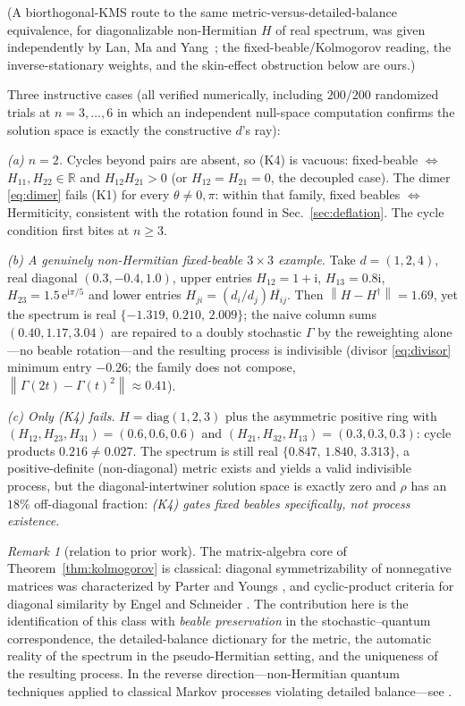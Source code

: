 \documentclass[11pt]{article}
\theoremstyle{definition}
\theoremstyle{remark}
\newtheorem{remark}[theorem]{Remark}
\newcommand{\ii}{\mathrm{i}}
\newcommand{\ee}{\mathrm{e}}
\newcommand{\Gam}{\Gamma}
\newcommand{\norm}[1]{\left\lVert #1 \right\rVert}
\begin{document}
(A biorthogonal-KMS route to the same metric-versus-detailed-balance
equivalence, for diagonalizable non-Hermitian $H$ of real spectrum, was
given independently by Lan, Ma and Yang~\cite{LanMaYang2026}; the
fixed-beable/Kolmogorov reading, the inverse-stationary weights, and the
skin-effect obstruction below are ours.)

Three instructive cases (all verified numerically, including $200/200$
randomized trials at $n=3,\dots,6$ in which an independent null-space
computation confirms the solution space is exactly the constructive
$d$'s ray):

\emph{(a) $n=2$.} Cycles beyond pairs are absent, so (K4) is vacuous:
fixed-beable $\Leftrightarrow$ $H_{11},H_{22}\in\mathbb R$ and
$H_{12}H_{21}>0$ (or $H_{12}=H_{21}=0$, the decoupled case). The dimer \eqref{eq:dimer} fails (K1) for every
$\theta\ne 0,\pi$: within that family, fixed beables $\Leftrightarrow$
Hermiticity, consistent with the rotation found in
Sec.~\ref{sec:deflation}. The cycle condition first bites at $n\ge 3$.

\emph{(b) A genuinely non-Hermitian fixed-beable $3\times3$ example.}
Take $d=(1,2,4)$, real diagonal $(0.3,-0.4,1.0)$, upper entries
$H_{12}=1+\ii$, $H_{13}=0.8\ii$, $H_{23}=1.5\,\ee^{\ii\pi/5}$ and lower
entries $H_{ji}=(d_i/d_j)\overline{H_{ij}}$. Then
$\norm{H-H^{\dagger}}=1.69$, yet the spectrum is real
$\{-1.319,\,0.210,\,2.009\}$; the naive column sums $(0.40,1.17,3.04)$ are
repaired to a doubly stochastic $\Gam$ by the reweighting alone---no
beable rotation---and the resulting process is indivisible (divisor \eqref{eq:divisor} minimum
entry $-0.26$; the family does not compose, $\norm{\Gam(2t)-\Gam(t)^{2}}\approx0.41$).

\emph{(c) Only (K4) fails.} $H=\mathrm{diag}(1,2,3)$ plus the asymmetric
positive ring with $(H_{12},H_{23},H_{31})=(0.6,0.6,0.6)$ and
$(H_{21},H_{32},H_{13})=(0.3,0.3,0.3)$: cycle products $0.216\ne0.027$.
The spectrum is still real $\{0.847,\,1.840,\,3.313\}$, a positive-definite
(non-diagonal) metric exists and yields a valid indivisible process, but
the diagonal-intertwiner solution space is exactly zero and $\rho$ has an
$18\%$ off-diagonal fraction: \emph{(K4) gates fixed beables specifically,
not process existence.}

\begin{remark}[relation to prior work]
The matrix-algebra core of Theorem~\ref{thm:kolmogorov} is classical:
diagonal symmetrizability of nonnegative matrices was characterized by
Parter and Youngs \cite{ParterYoungs1962}, and cyclic-product criteria for
diagonal similarity by Engel and Schneider \cite{EngelSchneider1973}. The
contribution here is the identification of this class with \emph{beable
preservation} in the stochastic--quantum correspondence, the
detailed-balance dictionary for the metric, the automatic reality of the
spectrum in the pseudo-Hermitian setting, and the uniqueness of the
resulting process. In the reverse direction---non-Hermitian quantum
techniques applied to classical Markov processes violating detailed
balance---see \cite{VanWesemael2025}.
\end{remark}
\end{document}
